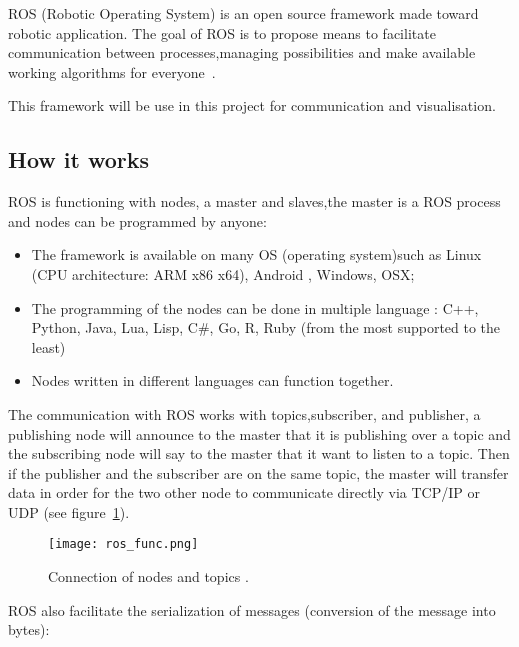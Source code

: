 ROS (Robotic Operating System) is an open source framework made toward robotic application.
The goal of ROS is to propose means to facilitate communication between processes,managing possibilities and make available working algorithms for everyone~\cite{quigley2009ros}.

This framework will be use in this project for communication and visualisation.

\subsection{How it works}

ROS is functioning with nodes, a master and slaves,the master is a ROS process and nodes can be programmed by anyone:

\begin{itemize}[label=$-$,itemsep=0cm,topsep=0cm]
\item The framework is available on many OS (operating system)such as Linux (CPU architecture: ARM x86 x64), Android , Windows, OSX;
\item The programming of the nodes can be done in multiple language : C++, Python, Java, Lua, Lisp, C\#, Go, R, Ruby (from the most supported to the least)
\item Nodes written in different languages can function together.
\end{itemize}

The communication with ROS works with topics,subscriber, and publisher, a publishing node will announce to the master that it is publishing over a topic and the subscribing node will say to the master that it want to listen to a topic. Then if the publisher and the subscriber are on the same topic, the master will transfer data in order for the two other node to communicate directly via TCP/IP or UDP (see figure~\ref{fig:rosTopic}).

\begin{figure}[H]
\centering
\texttt{[image: ros\_func.png]}
\caption{Connection of nodes and topics \cite{rusu13ros}.}
\label{fig:rosTopic}
\end{figure}

ROS also facilitate the serialization of messages (conversion of the message into bytes):\\

